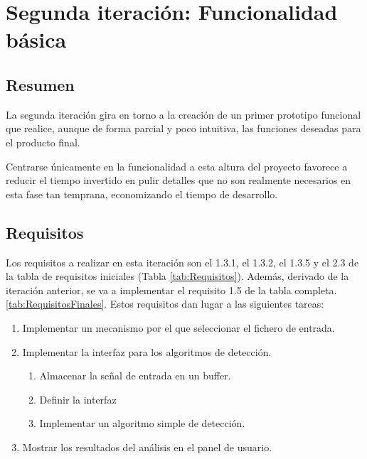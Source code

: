 
\section{Segunda iteración: Funcionalidad básica}
    \subsection{Resumen}
        La segunda iteración gira en torno a la creación de un primer prototipo funcional que realice, aunque de forma parcial y poco intuitiva, las funciones deseadas para el producto final.

        Centrarse únicamente en la funcionalidad a esta altura del proyecto favorece a reducir el tiempo invertido en pulir detalles que no son realmente necesarios en esta fase tan temprana, economizando el tiempo de desarrollo.

    \subsection{Requisitos}
        Los requisitos a realizar en esta iteración son el 1.3.1, el 1.3.2, el 1.3.5 y el 2.3 de la tabla de requisitos iniciales (Tabla \ref{tab:Requisitos}). Además, derivado de la iteración anterior, se va a implementar el requisito 1.5 de la tabla completa. \ref{tab:RequisitosFinales}. Estos requisitos dan lugar a las siguientes tareas:
    
        \begin{enumerate}
            \item Implementar un mecanismo por el que seleccionar el fichero de entrada.
            \item Implementar la interfaz para los algoritmos de detección.
            \begin{enumerate}
                \item Almacenar la señal de entrada en un buffer.
                \item Definir la interfaz
                \item Implementar un algoritmo simple de detección.
            \end{enumerate}
            \item Mostrar los resultados del análisis en el panel de usuario.
        \end{enumerate}
        
